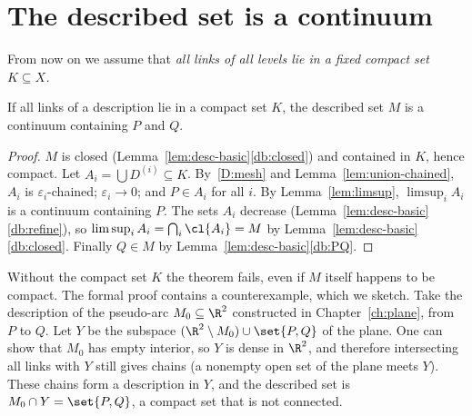 \section{The described set is a continuum}

From now on we assume that \emph{all links of all levels lie in a fixed compact set
$K\subseteq X$.}

\begin{theorem}\label{thm:desc-continuum}
If all links of a description lie in a compact set $K$, the described set $M$ is a continuum
containing $P$ and $Q$.
\end{theorem}

\begin{proof}
$M$ is closed (Lemma~\ref{lem:desc-basic}\ref{db:closed}) and contained in $K$, hence compact. Let
$A_i=\bigcup D^{(i)}\subseteq K$. By~\ref{D:mesh} and Lemma~\ref{lem:union-chained}, $A_i$ is
$\varepsilon_i$-chained; $\varepsilon_i\to0$; and $P\in A_i$ for all $i$. By
Lemma~\ref{lem:limsup}, $\limsup_iA_i$ is a continuum containing $P$. The sets $A_i$ decrease
(Lemma~\ref{lem:desc-basic}\ref{db:refine}), so
$\limsup_iA_i=\bigcap_i\cl{A_i}=M$ by Lemma~\ref{lem:desc-basic}\ref{db:closed}. Finally
$Q\in M$ by Lemma~\ref{lem:desc-basic}\ref{db:PQ}.
\end{proof}


\begin{remark}\label{rem:compact-needed}
Without the compact set $K$ the theorem fails, even if $M$ itself happens to be compact. The
formal proof contains a counterexample, which we sketch. Take the description of the
pseudo-arc $M_0\subseteq\R^2$ constructed in Chapter~\ref{ch:plane}, from $P$ to $Q$. Let $Y$ be
the subspace $(\R^2\setminus M_0)\cup\set{P,Q}$ of the plane. One can show that $M_0$ has empty
interior, so $Y$ is dense in $\R^2$, and therefore intersecting all links with $Y$ still gives
chains (a nonempty open set of the plane meets $Y$). These chains form a description in $Y$,
and the described set is $M_0\cap Y=\set{P,Q}$, a compact set that is not connected.
\end{remark}


